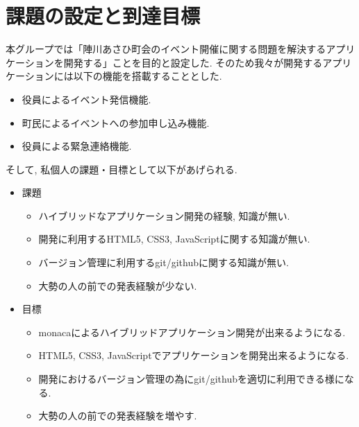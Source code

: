 \section{課題の設定と到達目標}
本グループでは「陣川あさひ町会のイベント開催に関する問題を解決するアプリケーションを開発する」ことを目的と設定した.
そのため我々が開発するアプリケーションには以下の機能を搭載することとした.
\begin{itemize}
    \item 役員によるイベント発信機能.
    \item 町民によるイベントへの参加申し込み機能.
    \item 役員による緊急連絡機能.
\end{itemize}
そして, 私個人の課題・目標として以下があげられる.
\begin{itemize}
    \item 課題
    \begin{itemize}
        \item ハイブリッドなアプリケーション開発の経験, 知識が無い.
        \item 開発に利用するHTML5, CSS3, JavaScriptに関する知識が無い.
        \item バージョン管理に利用するgit/githubに関する知識が無い.
        \item 大勢の人の前での発表経験が少ない.
    \end{itemize}

    \item 目標
    \begin{itemize}
        \item monacaによるハイブリッドアプリケーション開発が出来るようになる.
        \item HTML5, CSS3, JavaScriptでアプリケーションを開発出来るようになる.
        \item 開発におけるバージョン管理の為にgit/githubを適切に利用できる様になる.
        \item 大勢の人の前での発表経験を増やす.
    \end{itemize}
\end{itemize}
